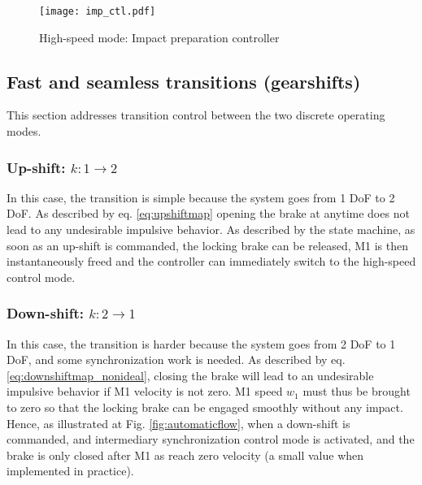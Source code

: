 \begin{figure}[p]
	\centering
		\texttt{[image: imp\_ctl.pdf]}
	\caption{High-speed mode: Impact preparation controller}
	\label{fig:imp_loop}
\end{figure}



\subsection{Fast and seamless transitions (gearshifts)}
\label{sec:fastshifts}

This section addresses transition control between the two discrete operating modes.


\subsubsection{Up-shift: $k:1\rightarrow2$}
In this case, the transition is simple because the system goes from 1 DoF to 2 DoF. As described by eq. \eqref{eq:upshiftmap} opening the brake at anytime does not lead to any undesirable impulsive behavior. As described by the state machine, as soon as an up-shift is commanded, the locking brake can be released, M1 is then instantaneously freed and the controller can immediately switch to the high-speed control mode.
%

\subsubsection{Down-shift: $k:2\rightarrow1$}
In this case, the transition is harder because the system goes from 2 DoF to 1 DoF, and some synchronization work is needed. As described by eq. \eqref{eq:downshiftmap_nonideal}, closing the brake will lead to an undesirable impulsive behavior if M1 velocity is not zero. M1 speed $w_1$ must thus be brought to zero so that the locking brake can be engaged smoothly without any impact. Hence, as illustrated at Fig. \ref{fig:automaticflow}, when a down-shift is commanded, and intermediary synchronization control mode is activated, and the brake is only closed after M1 as reach zero velocity (a small value when implemented in practice). %

